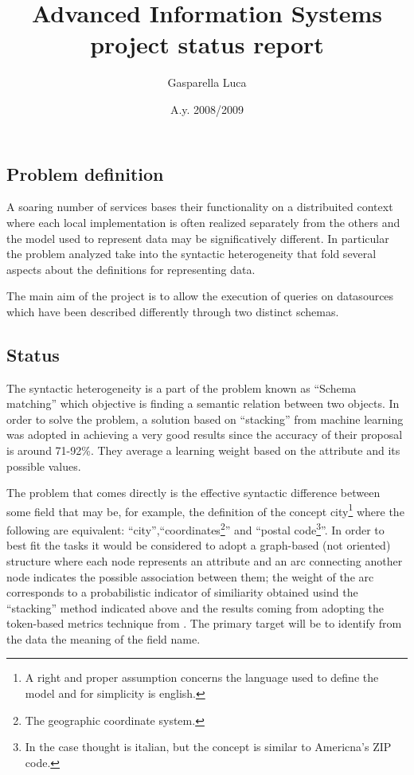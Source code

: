 \documentclass[12pt,a4paper]{article}
\title{Advanced Information Systems\\ project status report}
\author{Gasparella Luca}
\date{A.y. 2008/2009}
\begin{document}
\maketitle
\subsection*{Problem definition}
A soaring number of services bases their functionality on a distribuited context where each local implementation is often realized separately from the others and the model used to represent data may be significatively different. In particular the problem analyzed take into the syntactic heterogeneity that fold several aspects about the definitions for representing data.

The main aim of the project is to allow the execution of queries on datasources which have been described differently through two distinct schemas.

\subsection*{Status}
The syntactic heterogeneity is a part of the problem known as ``Schema matching'' which objective is finding a semantic relation between two objects. In order to solve the problem, a solution based on ``stacking'' from machine learning was adopted in \cite{learningMDS} achieving a very good results since the accuracy of their proposal is around 71-92\%. They average a learning weight based on the attribute and its possible values.

The problem that comes directly is the effective syntactic difference between some field that may be, for example, the definition of the concept city\footnote{A right and proper assumption concerns the language used to define the model and for simplicity is english.} where the following are equivalent: ``city'',``coordinates\footnote{The geographic coordinate system.}'' and ``postal code\footnote{In the case thought is italian, but the concept is similar to Americna's ZIP code.}''. In order to best fit the tasks it would be considered to adopt a graph-based (not oriented) structure where each node represents an attribute and an arc connecting another node indicates the possible association between them; the weight of the arc corresponds to a probabilistic indicator of similiarity obtained usind the ``stacking'' method indicated above and the results coming from \cite{iDS} adopting the token-based metrics technique from \cite{drd}. The primary target will be to identify from the data the meaning of the field name.
\end{document}
